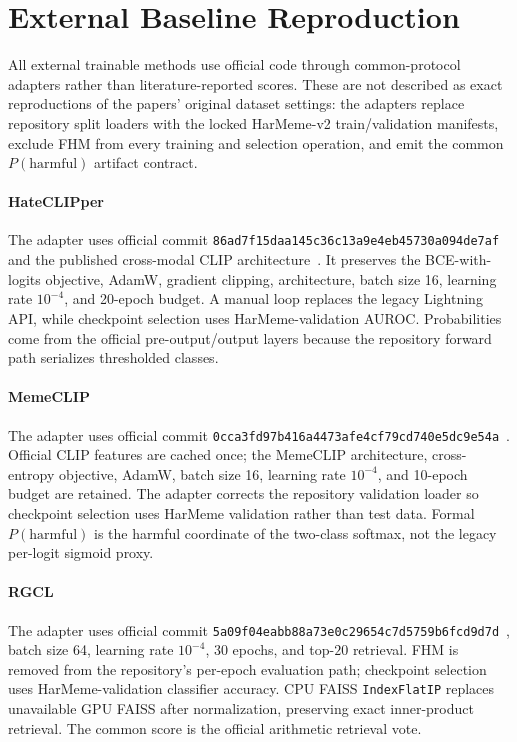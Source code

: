 \section{External Baseline Reproduction}
\label{sec:supp:baselines}

All external trainable methods use official code through common-protocol
adapters rather than literature-reported scores.  These are not described as
exact reproductions of the papers' original dataset settings: the adapters
replace repository split loaders with the locked HarMeme-v2 train/validation
manifests, exclude FHM from every training and selection operation, and emit
the common $P(\text{harmful})$ artifact contract.

\paragraph{HateCLIPper}
The adapter uses official commit
\nolinkurl{86ad7f15daa145c36c13a9e4eb45730a094de7af} and the published
cross-modal CLIP architecture~\cite{kumar2022hateclipper}.  It preserves the
BCE-with-logits objective, AdamW, gradient clipping, architecture, batch size
16, learning rate $10^{-4}$, and 20-epoch budget.  A manual loop replaces the
legacy Lightning API, while checkpoint selection uses HarMeme-validation
AUROC.  Probabilities come from the official pre-output/output layers because
the repository forward path serializes thresholded classes.

\paragraph{MemeCLIP}
The adapter uses official commit
\nolinkurl{0cca3fd97b416a4473afe4cf79cd740e5dc9e54a}~\cite{shah2024memeclip}.
Official CLIP features are cached once; the MemeCLIP architecture,
cross-entropy objective, AdamW, batch size 16, learning rate $10^{-4}$, and
10-epoch budget are retained.  The adapter corrects the repository validation
loader so checkpoint selection uses HarMeme validation rather than test data.
Formal $P(\text{harmful})$ is the harmful coordinate of the two-class softmax,
not the legacy
per-logit sigmoid proxy.

\paragraph{RGCL}
The adapter uses official commit
\nolinkurl{5a09f04eabb88a73e0c29654c7d5759b6fcd9d7d}~\cite{mei2024rgcl}, batch
size 64, learning rate $10^{-4}$, 30 epochs, and top-$20$ retrieval.  FHM is
removed from the repository's per-epoch evaluation path; checkpoint selection
uses HarMeme-validation classifier accuracy.  CPU FAISS \texttt{IndexFlatIP}
replaces unavailable GPU FAISS after normalization, preserving exact
inner-product retrieval.  The common score is the official arithmetic
retrieval vote.

